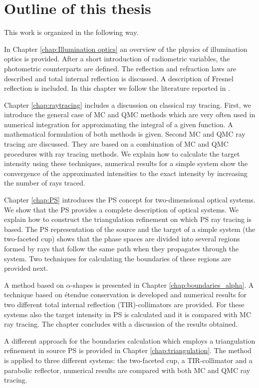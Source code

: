 \section{Outline of this thesis}
This work is organized in the following way.

In Chapter \ref{chap:Illumination optics} an overview of the physics of illumination optics is provided. After a short introduction of radiometric variables, the photometric counterparts are defined. The reflection and refraction laws are described and total internal reflection is discussed. A description of Fresnel reflection is included. In this chapter we follow the literature reported in \cite{hecht1998hecht, feynman2011feynman, feynman1964feynman}.

Chapter \ref{chap:raytracing} includes a discussion on classical ray tracing. First, we introduce the general case of MC and QMC methods which are very often used in numerical integration for approximating the integral of a given function. A mathematical formulation of both methods is given. Second MC and QMC ray tracing are discussed. They are based on a combination of MC and QMC procedures with ray tracing methods. We explain how to calculate the target intensity using these techniques, numerical results for a simple system show the convergence of the approximated intensities to the exact intensity by increasing the number of rays traced.

Chapter \ref{chap:PS} introduces the PS concept for two-dimensional optical systems. We show that the PS provides a complete description of optical systems. We explain how to construct the triangulation refinement on which PS ray tracing is based. The PS representation of the source and the target of a simple system (the two-faceted cup) shows that the phase spaces are divided into several regions formed by rays that follow the same path when they propagates through the system. Two techniques for calculating the boundaries of these regions are provided next. 
 
A method based on $\alpha$-shapes is presented in Chapter \ref{chap:boundaries_alpha}. A technique based on \'{e}tendue conservation is developed and numerical results for two different total internal reflection (TIR)-collimators are provided. For these systems also the target intensity in PS is calculated and it is compared with MC ray tracing. The chapter concludes with a discussion of the results obtained.

A different approach for the boundaries calculation which employs a triangulation refinement in source PS is provided in Chapter \ref{chap:triangulation}. The method is applied to three different systems: the two-faceted cup, a TIR-collimator and a parabolic reflector, numerical results are compared with both MC and QMC ray tracing.

